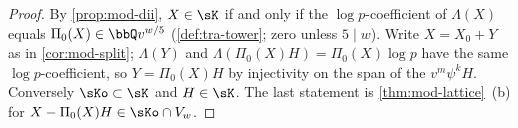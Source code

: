 \begin{proof}
By \cref{prop:mod-dii}, $X\in\sK$ if and only if the $\log p$-coefficient of $\Lambda(X)$ equals $\Pi_0(X)\in\bbQ v^{w/5}$ (\cref{def:tra-tower}; zero unless $5\mid w$). Write $X=X_0+Y$ as in \cref{cor:mod-split}; $\Lambda(Y)$ and $\Lambda(\Pi_0(X)H)=\Pi_0(X)\log p$ have the same $\log p$-coefficient, so $Y=\Pi_0(X)H$ by injectivity on the span of the $v^m\psi^kH$. Conversely $\sKo\subset\sK$ and $H\in\sK$. The last statement is \cref{thm:mod-lattice}~(b) for $X-\Pi_0(X)H\in\sKo\cap V_w$.
\end{proof}


